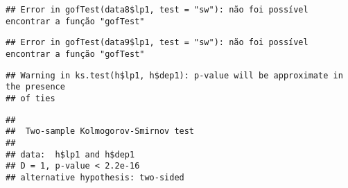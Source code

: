 \documentclass[
]{article}
\newenvironment{Shaded}{\begin{snugshade}}{\end{snugshade}}
\newcommand{\AttributeTok}[1]{\textcolor[rgb]{0.77,0.63,0.00}{#1}}
\newcommand{\CommentTok}[1]{\textcolor[rgb]{0.56,0.35,0.01}{\textit{#1}}}
\newcommand{\DecValTok}[1]{\textcolor[rgb]{0.00,0.00,0.81}{#1}}
\newcommand{\FunctionTok}[1]{\textcolor[rgb]{0.00,0.00,0.00}{#1}}
\newcommand{\NormalTok}[1]{#1}
\newcommand{\OtherTok}[1]{\textcolor[rgb]{0.56,0.35,0.01}{#1}}
\newcommand{\SpecialCharTok}[1]{\textcolor[rgb]{0.00,0.00,0.00}{#1}}
\newcommand{\StringTok}[1]{\textcolor[rgb]{0.31,0.60,0.02}{#1}}
\begin{document}
\begin{verbatim}
## Error in gofTest(data8$lp1, test = "sw"): não foi possível encontrar a função "gofTest"
\end{verbatim}

\begin{Shaded}
\end{Shaded}

\begin{verbatim}
## Error in gofTest(data9$lp1, test = "sw"): não foi possível encontrar a função "gofTest"
\end{verbatim}

\begin{Shaded}
\end{Shaded}

\begin{verbatim}
## Warning in ks.test(h$lp1, h$dep1): p-value will be approximate in the presence
## of ties
\end{verbatim}

\begin{verbatim}
## 
##  Two-sample Kolmogorov-Smirnov test
## 
## data:  h$lp1 and h$dep1
## D = 1, p-value < 2.2e-16
## alternative hypothesis: two-sided
\end{verbatim}

\begin{Shaded}
\end{Shaded}
\end{document}

